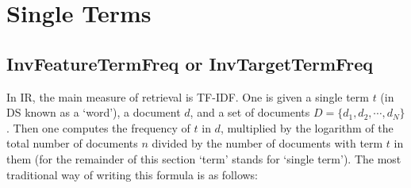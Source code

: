 




\section{Single Terms}


\subsection{InvFeatureTermFreq or InvTargetTermFreq}




 

In IR, the main measure of retrieval is TF-IDF. One is given a  single term $t$ (in DS known as a `word'),  a document $d$, and a set of documents $D = \{d_1, d_2, \cdots, d_N\}$. Then one computes  the frequency  of   $t$  in $d$, multiplied by  the logarithm of the  total number of documents $n$ divided by the number of documents with  term $t$ in them (for the remainder of this section `term' stands for `single term'). The most traditional way of writing this formula is as  follows:

